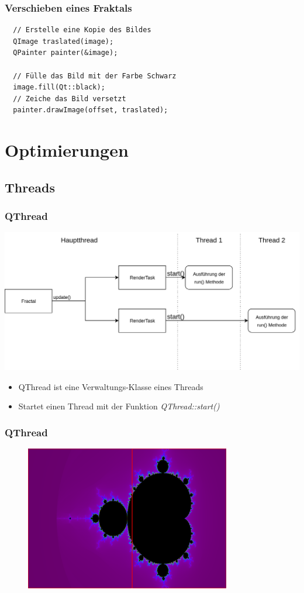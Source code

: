 \documentclass[unknownkeysallowed]{beamer}
\begin{document}
\begin{frame}[fragile]
  \frametitle{Verschieben eines Fraktals}
  \begin{verbatim}
  // Erstelle eine Kopie des Bildes
  QImage traslated(image);
  QPainter painter(&image);

  // Fülle das Bild mit der Farbe Schwarz
  image.fill(Qt::black);
  // Zeiche das Bild versetzt
  painter.drawImage(offset, traslated);
  \end{verbatim}
\end{frame}

\section{Optimierungen}
\subsection{Threads}
\begin{frame}
  \frametitle{QThread}
  \includegraphics[width=1.0\textwidth]{images/thread-diagram.png}
  \begin{itemize}
    \item QThread ist eine Verwaltungs-Klasse eines Threads
    \item Startet einen Thread mit der Funktion \emph{QThread::start()}
  \end{itemize}
\end{frame}

\begin{frame}
  \frametitle{QThread}
  \begin{figure}
    \centering
    \includegraphics[width=0.8\textwidth]{images/fractal-mandelbrot-threads.png}
  \end{figure}
\end{frame}
\end{document}
